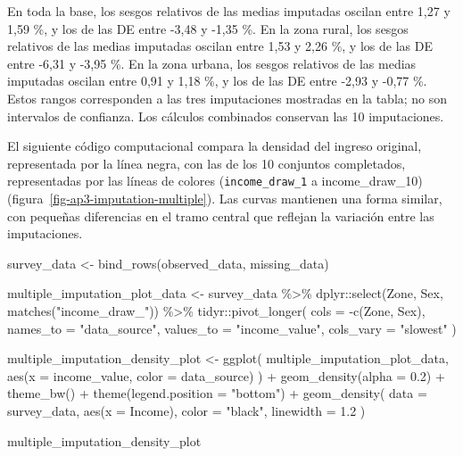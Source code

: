 \documentclass[
  spanish,
  11pt,
  letterpaper,
  oneside,
  open=any]{scrbook}
\newenvironment{Shaded}{\begin{snugshade}}{\end{snugshade}}
\newcommand{\AttributeTok}[1]{\textcolor[rgb]{0.40,0.45,0.13}{#1}}
\newcommand{\FloatTok}[1]{\textcolor[rgb]{0.68,0.00,0.00}{#1}}
\newcommand{\FunctionTok}[1]{\textcolor[rgb]{0.28,0.35,0.67}{#1}}
\newcommand{\NormalTok}[1]{\textcolor[rgb]{0.00,0.23,0.31}{#1}}
\newcommand{\OtherTok}[1]{\textcolor[rgb]{0.00,0.23,0.31}{#1}}
\newcommand{\SpecialCharTok}[1]{\textcolor[rgb]{0.37,0.37,0.37}{#1}}
\newcommand{\StringTok}[1]{\textcolor[rgb]{0.13,0.47,0.30}{#1}}
\begin{document}
En toda la base, los sesgos relativos de las medias imputadas oscilan
entre 1,27 y 1,59 \%, y los de las DE entre -3,48 y -1,35 \%. En la zona
rural, los sesgos relativos de las medias imputadas oscilan entre 1,53 y
2,26 \%, y los de las DE entre -6,31 y -3,95 \%. En la zona urbana, los
sesgos relativos de las medias imputadas oscilan entre 0,91 y 1,18 \%, y
los de las DE entre -2,93 y -0,77 \%. Estos rangos corresponden a las
tres imputaciones mostradas en la tabla; no son intervalos de confianza.
Los cálculos combinados conservan las 10 imputaciones.

El siguiente código computacional compara la densidad del ingreso
original, representada por la línea negra, con las de los 10 conjuntos
completados, representadas por las líneas de colores
(\texttt{income\_draw\_1} a income\_draw\_10)
(figura~\ref{fig-ap3-imputation-multiple}). Las curvas mantienen una
forma similar, con pequeñas diferencias en el tramo central que reflejan
la variación entre las imputaciones.

\begin{Shaded}
\begin{Highlighting}[]
\NormalTok{survey\_data }\OtherTok{\textless{}{-}} \FunctionTok{bind\_rows}\NormalTok{(observed\_data, missing\_data)}

\NormalTok{multiple\_imputation\_plot\_data }\OtherTok{\textless{}{-}}\NormalTok{ survey\_data }\SpecialCharTok{\%\textgreater{}\%}
\NormalTok{  dplyr}\SpecialCharTok{::}\FunctionTok{select}\NormalTok{(Zone, Sex, }\FunctionTok{matches}\NormalTok{(}\StringTok{"income\_draw\_"}\NormalTok{)) }\SpecialCharTok{\%\textgreater{}\%}
\NormalTok{  tidyr}\SpecialCharTok{::}\FunctionTok{pivot\_longer}\NormalTok{(}
    \AttributeTok{cols =} \SpecialCharTok{{-}}\FunctionTok{c}\NormalTok{(Zone, Sex),}
    \AttributeTok{names\_to =} \StringTok{"data\_source"}\NormalTok{,}
    \AttributeTok{values\_to =} \StringTok{"income\_value"}\NormalTok{,}
    \AttributeTok{cols\_vary =} \StringTok{"slowest"}
\NormalTok{  )}

\NormalTok{multiple\_imputation\_density\_plot }\OtherTok{\textless{}{-}} \FunctionTok{ggplot}\NormalTok{(}
\NormalTok{  multiple\_imputation\_plot\_data,}
  \FunctionTok{aes}\NormalTok{(}\AttributeTok{x =}\NormalTok{ income\_value, }\AttributeTok{color =}\NormalTok{ data\_source)}
\NormalTok{) }\SpecialCharTok{+}
  \FunctionTok{geom\_density}\NormalTok{(}\AttributeTok{alpha =} \FloatTok{0.2}\NormalTok{) }\SpecialCharTok{+}
  \FunctionTok{theme\_bw}\NormalTok{() }\SpecialCharTok{+}
  \FunctionTok{theme}\NormalTok{(}\AttributeTok{legend.position =} \StringTok{"bottom"}\NormalTok{) }\SpecialCharTok{+}
  \FunctionTok{geom\_density}\NormalTok{(}
    \AttributeTok{data =}\NormalTok{ survey\_data,}
    \FunctionTok{aes}\NormalTok{(}\AttributeTok{x =}\NormalTok{ Income),}
    \AttributeTok{color =} \StringTok{"black"}\NormalTok{,}
    \AttributeTok{linewidth =} \FloatTok{1.2}
\NormalTok{  )}

\NormalTok{multiple\_imputation\_density\_plot}
\end{Highlighting}
\end{Shaded}
\end{document}
